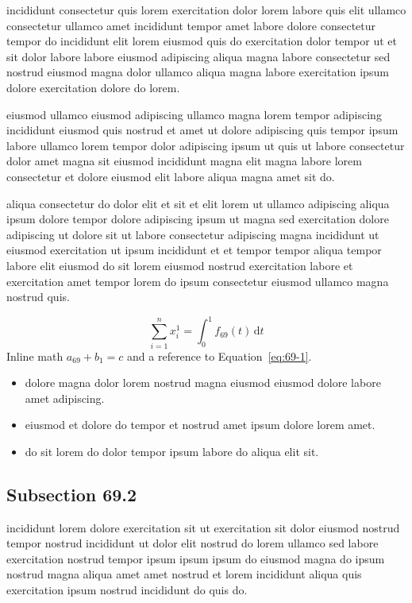 \documentclass{article}
\begin{document}
incididunt consectetur quis lorem exercitation dolor lorem labore quis elit ullamco consectetur ullamco amet incididunt tempor amet labore dolore consectetur tempor do incididunt elit lorem eiusmod quis do exercitation dolor tempor ut et sit dolor labore labore eiusmod adipiscing aliqua magna labore consectetur sed nostrud eiusmod magna dolor ullamco aliqua magna labore exercitation ipsum dolore exercitation dolore do lorem.

eiusmod ullamco eiusmod adipiscing ullamco magna lorem tempor adipiscing incididunt eiusmod quis nostrud et amet ut dolore adipiscing quis tempor ipsum labore ullamco lorem tempor dolor adipiscing ipsum ut quis ut labore consectetur dolor amet magna sit eiusmod incididunt magna elit magna labore lorem consectetur et dolore eiusmod elit labore aliqua magna amet sit do.

aliqua consectetur do dolor elit et sit et elit lorem ut ullamco adipiscing aliqua ipsum dolore tempor dolore adipiscing ipsum ut magna sed exercitation dolore adipiscing ut dolore sit ut labore consectetur adipiscing magna incididunt ut eiusmod exercitation ut ipsum incididunt et et tempor tempor aliqua tempor labore elit eiusmod do sit lorem eiusmod nostrud exercitation labore et exercitation amet tempor lorem do ipsum consectetur eiusmod ullamco magna nostrud quis.

\begin{equation}\label{eq:69-1}
  \sum_{i=1}^{n} x_i^{1} = \int_0^1 f_{69}(t)\,\mathrm{d}t
\end{equation}
Inline math $a_{69} + b_{1} = c$ and a reference to Equation~\eqref{eq:69-1}.

\begin{itemize}
  \item dolore magna dolor lorem nostrud magna eiusmod eiusmod dolore labore amet adipiscing.
  \item eiusmod et dolore do tempor et nostrud amet ipsum dolore lorem amet.
  \item do sit lorem do dolor tempor ipsum labore do aliqua elit sit.
\end{itemize}

\subsection{Subsection 69.2}\label{sec:69-2}
incididunt lorem dolore exercitation sit ut exercitation sit dolor eiusmod nostrud tempor nostrud incididunt ut dolor elit nostrud do lorem ullamco sed labore exercitation nostrud tempor ipsum ipsum ipsum do eiusmod magna do ipsum nostrud magna aliqua amet amet nostrud et lorem incididunt aliqua quis exercitation ipsum nostrud incididunt do quis do.
\end{document}
